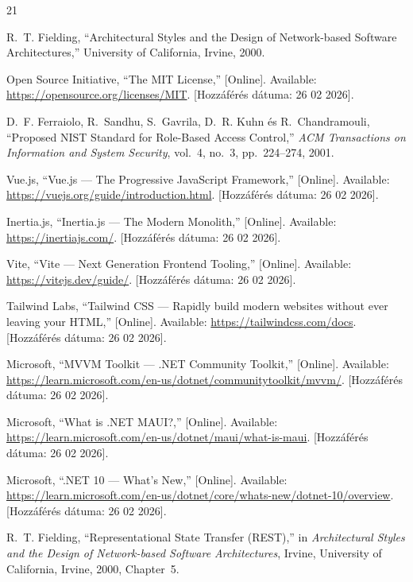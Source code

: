 \documentclass[colorlinks]{thesis-kando}
\begin{document}
\begin{thebibliography}{21}

R.~T. Fielding, ``Architectural Styles and the Design of Network-based Software Architectures,'' University of California, Irvine, 2000.

Open Source Initiative, ``The MIT License,'' [Online]. Available: \url{https://opensource.org/licenses/MIT}. [Hozzáférés dátuma: 26 02 2026].

D.~F. Ferraiolo, R.~Sandhu, S.~Gavrila, D.~R. Kuhn és R.~Chandramouli, ``Proposed NIST Standard for Role-Based Access Control,'' \emph{ACM Transactions on Information and System Security}, vol.~4, no.~3, pp.~224--274, 2001.

Vue.js, ``Vue.js --- The Progressive JavaScript Framework,'' [Online]. Available: \url{https://vuejs.org/guide/introduction.html}. [Hozzáférés dátuma: 26 02 2026].

Inertia.js, ``Inertia.js --- The Modern Monolith,'' [Online]. Available: \url{https://inertiajs.com/}. [Hozzáférés dátuma: 26 02 2026].

Vite, ``Vite --- Next Generation Frontend Tooling,'' [Online]. Available: \url{https://vitejs.dev/guide/}. [Hozzáférés dátuma: 26 02 2026].

Tailwind Labs, ``Tailwind CSS --- Rapidly build modern websites without ever leaving your HTML,'' [Online]. Available: \url{https://tailwindcss.com/docs}. [Hozzáférés dátuma: 26 02 2026].

Microsoft, ``MVVM Toolkit --- .NET Community Toolkit,'' [Online]. Available: \url{https://learn.microsoft.com/en-us/dotnet/communitytoolkit/mvvm/}. [Hozzáférés dátuma: 26 02 2026].

Microsoft, ``What is .NET MAUI?,'' [Online]. Available: \url{https://learn.microsoft.com/en-us/dotnet/maui/what-is-maui}. [Hozzáférés dátuma: 26 02 2026].

Microsoft, ``.NET 10 --- What's New,'' [Online]. Available: \url{https://learn.microsoft.com/en-us/dotnet/core/whats-new/dotnet-10/overview}. [Hozzáférés dátuma: 26 02 2026].

R.~T. Fielding, ``Representational State Transfer (REST),'' in \emph{Architectural Styles and the Design of Network-based Software Architectures}, Irvine, University of California, Irvine, 2000, Chapter~5.


\end{thebibliography}
\end{document}
